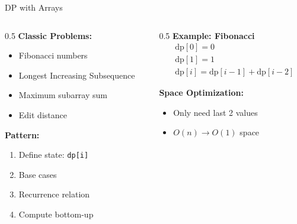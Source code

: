 \documentclass[aspectratio=169,xcolor=dvipsnames]{beamer}
\begin{document}
\begin{frame}{DP with Arrays}
  \begin{columns}
    \begin{column}{0.5\textwidth}
      \textbf{Classic Problems:}
      \begin{itemize}
        \item Fibonacci numbers
        \item Longest Increasing Subsequence
        \item Maximum subarray sum
        \item Edit distance
      \end{itemize}

      \vspace{0.3cm}
      \textbf{Pattern:}
      \begin{enumerate}
        \item Define state: \texttt{dp[i]}
        \item Base cases
        \item Recurrence relation
        \item Compute bottom-up
      \end{enumerate}
    \end{column}

    \begin{column}{0.5\textwidth}
      \textbf{Example: Fibonacci}
      \begin{align*}
        &\text{dp}[0] = 0 \\
        &\text{dp}[1] = 1 \\
        &\text{dp}[i] = \text{dp}[i-1] + \text{dp}[i-2]
      \end{align*}

      \vspace{0.3cm}
      \textbf{Space Optimization:}
      \begin{itemize}
        \item Only need last 2 values
        \item $O(n) \to O(1)$ space
      \end{itemize}
    \end{column}
  \end{columns}
\end{frame}
\end{document}
